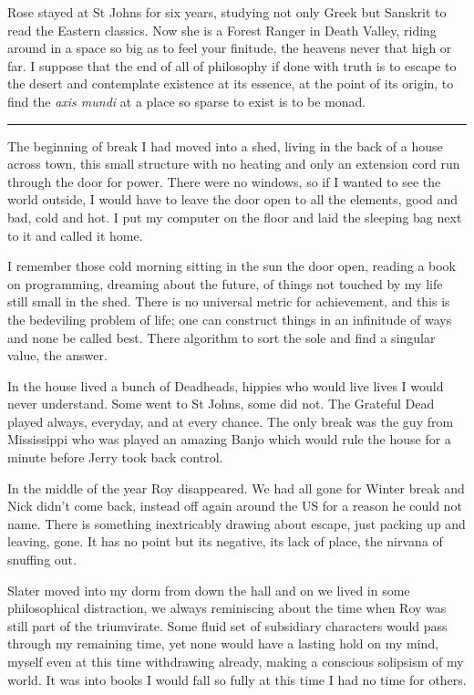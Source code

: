 \documentclass[ebook, 10pt, openright, onecolumn]{memoir}
\newcommand*\td[1]{
  \todo[inline]{
     #1 
  }
}
\newcommand*\starbreak{\fancybreak*{\Large{* * *}}}
\newcommand*\finish{\td{ ----- Finish this section -----}}
\begin{document}
Rose stayed at St Johns for six years, studying not only Greek but Sanskrit to
read the Eastern classics.  Now she is a Forest Ranger in Death Valley, riding
around in a space so big as to feel your finitude, the heavens never that high
or far.  I suppose that the end of all of philosophy if done with truth is to
escape to the desert and contemplate existence at its essence, at the point of
its origin, to find the \textit{axis mundi} at a place so sparse to exist is to
be monad. 

\starbreak

The beginning of break I had moved into a shed, living in the back of a house
across town, this small structure with no heating and only an extension cord run
through the door for power.  There were no windows, so if I wanted to see the
world outside, I would have to leave the door open to all the elements, good and
bad, cold and hot.  I put my computer on the floor and laid the sleeping bag
next to it and called it home.

I remember those cold morning sitting in the sun the door open, reading a book
on programming, dreaming about the future, of things not touched by my life
still small in the shed.  There is no universal metric for achievement, and this
is the bedeviling problem of life; one can construct things in an infinitude of
ways and none be called best.  There algorithm to sort the sole and find a
singular value, the answer.  

In the house lived a bunch of Deadheads, hippies who would live lives I would
never understand.  Some went to St Johns, some did not.  The Grateful Dead
played always, everyday, and at every chance.  The only break was the guy from
Mississippi who was played an amazing Banjo which would rule the house for a
minute before Jerry took back control.

\finish

In the middle of the year Roy disappeared. We had all gone for Winter break and
Nick didn't come back, instead off again around the US for a reason he could not
name.  There is something inextricably drawing about escape, just packing up and
leaving, gone.  It has no point but its negative, its lack of place, the nirvana
of snuffing out.

Slater moved into my dorm from down the hall and on we lived in some
philosophical distraction, we always reminiscing about the time when Roy was
still part of the triumvirate.  Some fluid set of subsidiary characters would
pass through my remaining time, yet none would have a lasting hold on my mind,
myself even at this time withdrawing already, making a conscious solipsism of my
world.  It was into books I would fall so fully at this time I had no time for
others.
\end{document}
